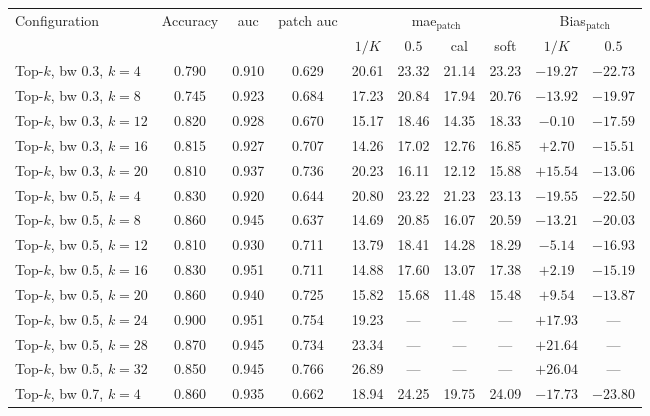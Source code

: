 \documentclass[12pt,parskip = half, DIV=classic,listof=totoc]{scrartcl}
\begin{document}
				\begin{table}[htbp]
					\centering
					\scriptsize
					\begin{tabular}{@{}lccccccccc@{}}
						\toprule
						\multirow{2}{*}{Configuration} & \multirow{2}{*}{Accuracy} & \multirow{2}{*}{\acs*{auc}} & \multirow{2}{*}{patch \acs*{auc}} & \multicolumn{4}{c}{\acs*{mae}$_{\text{patch}}$} & \multicolumn{2}{c}{Bias$_{\text{patch}}$} \\
						\cmidrule(lr){5-8}\cmidrule(lr){9-10}
						& & & & $1/K$ & $0.5$ & cal & soft & $1/K$ & $0.5$ \\
						\midrule
						Top-$k$, bw 0.3, $k=4$ & 0.790 & 0.910 & 0.629 & 20.61 & 23.32 & 21.14 & 23.23 & $-19.27$ & $-22.73$ \\
						Top-$k$, bw 0.3, $k=8$ & 0.745 & 0.923 & 0.684 & 17.23 & 20.84 & 17.94 & 20.76 & $-13.92$ & $-19.97$ \\
						Top-$k$, bw 0.3, $k=12$ & 0.820 & 0.928 & 0.670 & 15.17 & 18.46 & 14.35 & 18.33 & $-0.10$ & $-17.59$ \\
						Top-$k$, bw 0.3, $k=16$ & 0.815 & 0.927 & 0.707 & 14.26 & 17.02 & 12.76 & 16.85 & $+2.70$ & $-15.51$ \\
						Top-$k$, bw 0.3, $k=20$ & 0.810 & 0.937 & 0.736 & 20.23 & 16.11 & 12.12 & 15.88 & $+15.54$ & $-13.06$ \\
						\midrule
						Top-$k$, bw 0.5, $k=4$ & 0.830 & 0.920 & 0.644 & 20.80 & 23.22 & 21.23 & 23.13 & $-19.55$ & $-22.50$ \\
						Top-$k$, bw 0.5, $k=8$ & 0.860 & 0.945 & 0.637 & 14.69 & 20.85 & 16.07 & 20.59 & $-13.21$ & $-20.03$ \\
						Top-$k$, bw 0.5, $k=12$ & 0.810 & 0.930 & 0.711 & 13.79 & 18.41 & 14.28 & 18.29 & $-5.14$ & $-16.93$ \\
						Top-$k$, bw 0.5, $k=16$ & 0.830 & 0.951 & 0.711 & 14.88 & 17.60 & 13.07 & 17.38 & $+2.19$ & $-15.19$ \\
						Top-$k$, bw 0.5, $k=20$ & 0.860 & 0.940 & 0.725 & 15.82 & 15.68 & 11.48 & 15.48 & $+9.54$ & $-13.87$ \\
						Top-$k$, bw 0.5, $k=24$ & 0.900 & 0.951 & 0.754 & 19.23 & --- & --- & --- & $+17.93$ & --- \\
						Top-$k$, bw 0.5, $k=28$ & 0.870 & 0.945 & 0.734 & 23.34 & --- & --- & --- & $+21.64$ & --- \\
						Top-$k$, bw 0.5, $k=32$ & 0.850 & 0.945 & 0.766 & 26.89 & --- & --- & --- & $+26.04$ & --- \\
						\midrule
						Top-$k$, bw 0.7, $k=4$ & 0.860 & 0.935 & 0.662 & 18.94 & 24.25 & 19.75 & 24.09 & $-17.73$ & $-23.80$ \\

\end{tabular}
\end{table}
\end{document}
